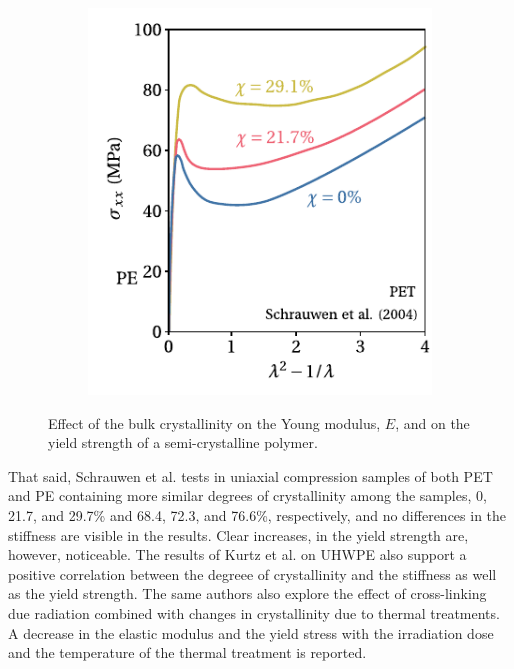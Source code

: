 \begin{figure}[hbtp]
\begin{subfigure}[b]{0.45\textwidth}
							\includegraphics[width=\textwidth]{figures/deg_cryst_yield}
							\caption{}
							\label{subfig:deg_cryst_yield}
			\end{subfigure}
  \caption{Effect of the bulk crystallinity on  the Young modulus, $E$, and on the  yield strength of a semi-crystalline polymer.}
\label{fig:deg_cryst_stiff}
\end{figure}
That said, Schrauwen et al. \citep{schrauwenIntrinsicDeformationBehavior2004} tests in uniaxial compression samples of both PET and PE containing more similar degrees of crystallinity among the samples, 0, 21.7, and 29.7\% and 68.4, 72.3, and 76.6\%, respectively, and no differences in the stiffness are visible in the results.
Clear increases, in the yield strength are, however, noticeable.
The results of Kurtz et al. \citep{kurtzThermomechanicalBehaviorVirgin2002} on UHWPE also support a positive correlation between the degreee of crystallinity and the stiffness as well as the yield strength.
The same authors \citep{kurtzMiniatureSpecimenMechanical1999, kurtzThermomechanicalBehaviorVirgin2002} also explore the effect of cross-linking due radiation combined with changes in crystallinity due to thermal treatments.
A decrease in the elastic modulus and the yield stress with the irradiation dose and the temperature of the thermal treatment is reported.

